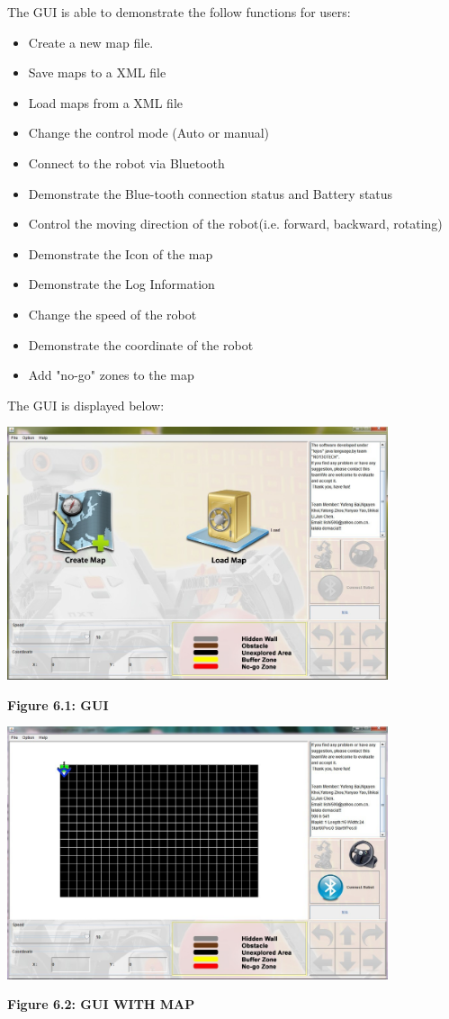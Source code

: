 \documentclass[11pt, a4paper]{report}
\begin{document}
The GUI is able to demonstrate the follow functions for users:
\begin{itemize}
\item Create a new map file.
\item Save maps to a XML file
\item Load maps from a XML file
\item Change the control mode (Auto or manual)
\item Connect to the robot via Bluetooth
\item Demonstrate the Blue-tooth connection status and Battery status
\item Control the moving direction of the robot(i.e. forward, backward, rotating)
\item Demonstrate the Icon of the map
\item Demonstrate the Log Information
\item Change the speed of the robot
\item Demonstrate the coordinate of the robot
\item Add "no-go" zones to the map
\end{itemize}
The GUI is displayed below:
\pagebreak
\begin{center}
 \includegraphics[width=11.20cm]{GUI_Initial.jpg}
\end{center}
\begin{center}
\textbf {Figure 6.1: GUI} \\[0.3cm]
\end{center}
\begin{center}
 \includegraphics[width=11.20cm]{Map.jpg}
\end{center}
\begin{center}
\textbf {Figure 6.2: GUI WITH MAP} \\[0.3cm]
\end{center}
\end{document}
